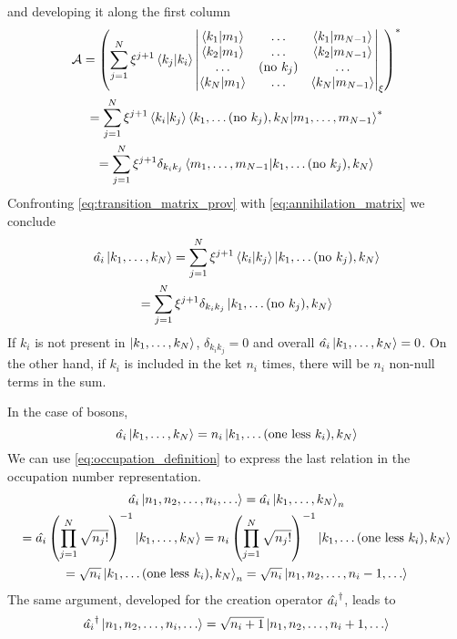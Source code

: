 and developing it along the first column
\begin{multline}
    \label{eq:transition_matrix_prov}
    \mathcal{A} = \left( \sum_{j=1}^N \xi^{j+1} \braket{k_j}{k_i}
    \begin{vmatrix}
        \braket{k_1}{m_1} & \dots            & \braket{k_1}{m_{N-1} } \\
        \braket{k_2}{m_1} & \dots            & \braket{k_2}{m_{N-1}}  \\
        \dots             & (\text{no } k_j) & \dots                  \\
        \braket{k_N}{m_1} & \dots            & \braket{k_N}{m_{N-1}}  \\
    \end{vmatrix}_\xi
    \right)^*
    \\ = \sum_{j=1}^N \xi^{j+1} \braket{k_i}{k_j}  \bra{k_1, \dots (\text{no } k_j), k_N} \ket{m_1, \dots, m_{N-1}}^*
    \\ = \sum_{j=1}^N \xi^{j+1} \delta_{k_ik_j}  \bra{m_1, \dots, m_{N-1}} \ket{k_1, \dots (\text{no } k_j), k_N}
\end{multline}
Confronting \cref{eq:transition_matrix_prov} with \cref{eq:annihilation_matrix} we conclude
\begin{multline} \label{eq:annihilation_operator}
    \hat{a_i} \ket{k_1, \dots, k_N}
    = \sum_{j=1}^N \xi^{j+1} \braket{k_i}{k_j} \ket{k_1, \dots (\text{no } k_j), k_N}
    \\= \sum_{j=1}^N \xi^{j+1} \delta_{k_ik_j} \ket{k_1, \dots (\text{no } k_j), k_N}
\end{multline}
If $k_i$ is not present in $\ket{k_1, \dots, k_N}$, $\delta_{k_ik_j} = 0$ and overall $ \hat{a_i} \ket{k_1, \dots, k_N} = 0$. On the other hand, if $k_i$ is included in the ket $n_i$ times, there will be $n_i$ non-null terms in the sum.

In the case of bosons,
\begin{equation}
    \hat{a_i} \ket{k_1, \dots, k_N} = n_i \ket{k_1, \dots (\text{one less }k_i), k_N}
\end{equation}
We can use \cref{eq:occupation_definition} to express the last relation in the occupation number representation.
\begin{multline}
    \hat{a_i} \ket{n_1, n_2, \dots, n_i, \dots} =
    \hat{a_i} \ket{k_1, \dots, k_N}_n
    \\ = \hat{a_i} \left( \prod_{j=1}^N \sqrt{n_j!} \right)^{-1} \ket{k_1, \dots, k_N}
    = n_i \left( \prod_{j=1}^N \sqrt{n_j!} \right)^{-1} \ket{k_1, \dots (\text{one less }k_i), k_N}
    \\ = \sqrt{n_i} \ket{k_1, \dots (\text{one less }k_i), k_N}_n = \sqrt{n_i} \ket{n_1, n_2, \dots, n_i-1, \dots}
\end{multline}
The same argument, developed for the creation operator $\hat{a_i}^\dagger$, leads to
\begin{equation}
    \hat{a_i}^\dagger \ket{n_1, n_2, \dots, n_i, \dots} = \sqrt{n_i+1} \ket{n_1, n_2, \dots, n_i+1, \dots}
\end{equation}

